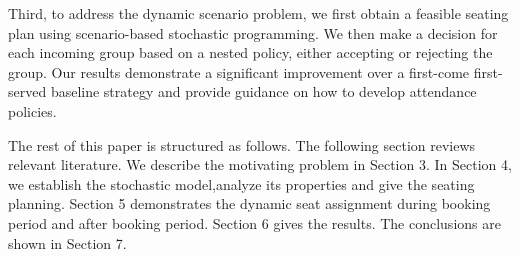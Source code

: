 Third, to address the dynamic scenario problem, we first obtain a feasible seating plan using scenario-based stochastic programming. We then make a decision for each incoming group based on a nested policy, either accepting or rejecting the group. Our results demonstrate a significant improvement over a first-come first-served baseline strategy and provide guidance on how to develop attendance policies.






The rest of this paper is structured as follows. The following section reviews relevant literature. We describe the motivating problem in Section 3. In Section 4, we establish the stochastic model,analyze its properties and give the seating planning. Section 5 demonstrates the dynamic seat assignment during booking period and after booking period. Section 6 gives the results. The conclusions are shown in Section 7.

\newpage
